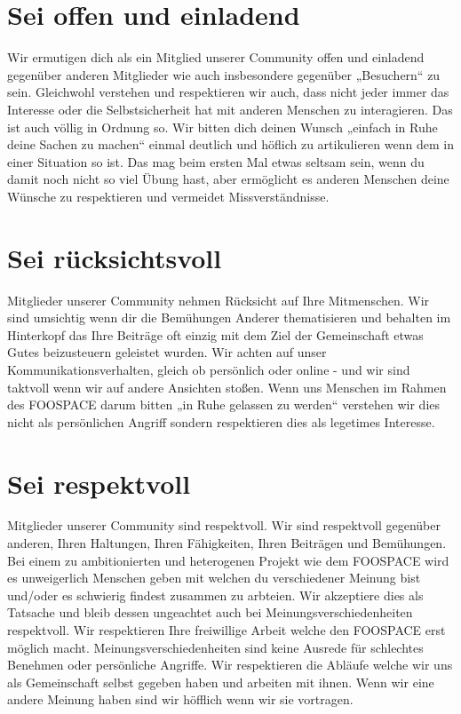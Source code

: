 \documentclass[10pt,a4paper]{article}
\begin{document}
\section{Sei offen und einladend}
Wir ermutigen dich als ein Mitglied unserer Community offen und einladend
gegenüber anderen Mitglieder wie auch insbesondere gegenüber „Besuchern“ zu
sein. Gleichwohl verstehen und respektieren wir auch, dass nicht jeder immer
das Interesse oder die Selbstsicherheit hat mit anderen Menschen zu
interagieren. Das ist auch völlig in Ordnung so. Wir bitten dich deinen Wunsch
„einfach in Ruhe deine Sachen zu machen“ einmal deutlich und höflich zu
artikulieren wenn dem in einer Situation so ist. Das mag beim ersten Mal etwas
seltsam sein, wenn du damit noch nicht so viel Übung hast, aber ermöglicht es
anderen Menschen deine Wünsche zu respektieren und vermeidet Missverständnisse.

\section{Sei rücksichtsvoll}
Mitglieder unserer Community nehmen Rücksicht auf Ihre Mitmenschen. Wir sind
umsichtig wenn dir die Bemühungen Anderer thematisieren und behalten im
Hinterkopf das Ihre Beiträge oft einzig mit dem Ziel der Gemeinschaft etwas Gutes
beizusteuern geleistet wurden. Wir achten auf unser Kommunikationsverhalten,
gleich ob persönlich oder online - und wir sind taktvoll wenn wir auf andere
Ansichten stoßen. Wenn uns Menschen im Rahmen des FOOSPACE darum bitten „in Ruhe
gelassen zu werden“ verstehen wir dies nicht als persönlichen Angriff sondern
respektieren dies als legetimes Interesse.

\section{Sei respektvoll}
Mitglieder unserer Community sind respektvoll. Wir sind respektvoll gegenüber
anderen, Ihren Haltungen, Ihren Fähigkeiten, Ihren Beiträgen und Bemühungen.
Bei einem zu ambitionierten und heterogenen Projekt wie dem FOOSPACE wird es
unweigerlich Menschen geben mit welchen du verschiedener Meinung bist und/oder
es schwierig findest zusammen zu arbteien. Wir akzeptiere dies als Tatsache und
bleib dessen ungeachtet auch bei Meinungsverschiedenheiten respektvoll. Wir
respektieren Ihre freiwillige Arbeit welche den FOOSPACE erst möglich macht.
Meinungsverschiedenheiten sind keine Ausrede für schlechtes Benehmen oder
persönliche Angriffe.  Wir respektieren die Abläufe welche wir uns als
Gemeinschaft selbst gegeben haben und arbeiten mit ihnen. Wenn wir eine andere
Meinung haben sind wir höfflich wenn wir sie vortragen.
\end{document}
